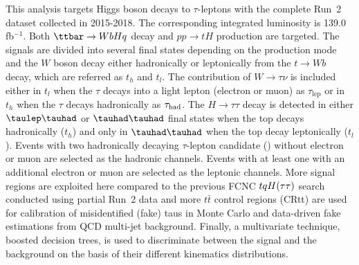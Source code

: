 
This analysis targets Higgs boson decays to 
$\tau$-leptons with the complete Run~2 dataset collected in 2015-2018. The corresponding integrated luminosity is 139.0 fb$^{-1}$. Both $\ttbar \to WbHq$ decay and $pp \to tH$ production are targeted. The signals are divided into several final states depending on the production mode and
the  $W$ boson decay either hadronically or leptonically from the $t\rightarrow Wb$ decay, which are referred as $t_h$ and $t_l$. The contribution of $W\rightarrow\tau\nu$ is included either in
$t_l$ when the $\tau$ decays into a light lepton (electron or muon) as $\tau_{\text{lep}}$ or in $t_h$ when the $\tau$ decays hadronically as $\tau_\text{had}$.
The $H\rightarrow \tau\tau$ decay is detected in
either $\tlhad$ or $\thadhad$ final states when the top decays hadronically ($t_h$) and only in $\thadhad$ when the top decay leptonically ($t_l$). 
Events with two hadronically decaying $\tau$-lepton candidate (\tauhad) without electron or muon are selected as the hadronic channels. Events with at least one \tauhad with an additional electron or muon are selected as the leptonic channels. More signal regions are exploited here compared to the previous FCNC $tqH(\tau\tau)$ search conducted using partial Run~2 data and more
$t\bar{t}$ control regions (CRtt) are used for calibration of misidentified (fake) taus in Monte Carlo and data-driven fake estimations from QCD multi-jet background.
Finally, a multivariate technique, boosted decision trees, is used to discriminate between the signal and the background on the basis of their different kinematics distributions. 

